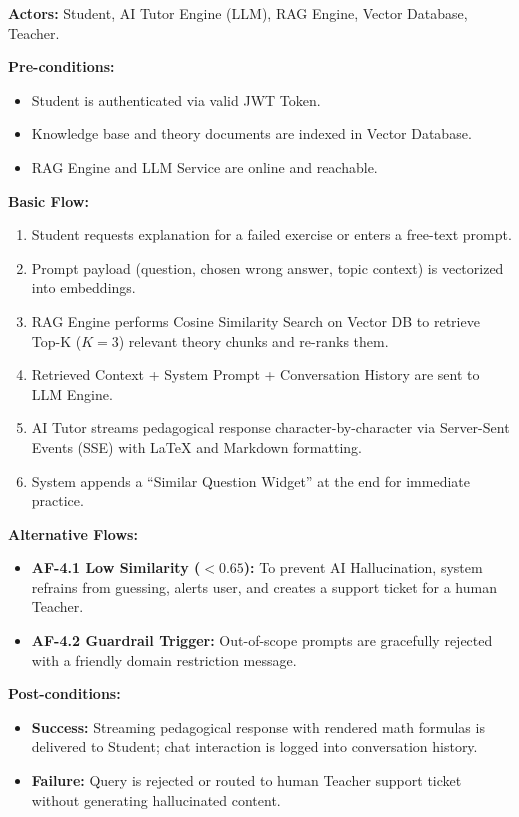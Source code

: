 \documentclass[12pt,a4paper]{article}
\begin{document}
\noindent\textbf{Actors:} Student, AI Tutor Engine (LLM), RAG Engine, Vector Database, Teacher.

\vspace{0.2cm}
\noindent\textbf{Pre-conditions:}
\begin{itemize}[leftmargin=1.5em, itemsep=0.1em]
    \item Student is authenticated via valid JWT Token.
    \item Knowledge base and theory documents are indexed in Vector Database.
    \item RAG Engine and LLM Service are online and reachable.
\end{itemize}

\noindent\textbf{Basic Flow:}
\begin{enumerate}[leftmargin=1.5em, itemsep=0.2em]
    \item Student requests explanation for a failed exercise or enters a free-text prompt.
    \item Prompt payload (question, chosen wrong answer, topic context) is vectorized into embeddings.
    \item RAG Engine performs Cosine Similarity Search on Vector DB to retrieve Top-K ($K=3$) relevant theory chunks and re-ranks them.
    \item Retrieved Context + System Prompt + Conversation History are sent to LLM Engine.
    \item AI Tutor streams pedagogical response character-by-character via Server-Sent Events (SSE) with LaTeX and Markdown formatting.
    \item System appends a ``Similar Question Widget'' at the end for immediate practice.
\end{enumerate}

\noindent\textbf{Alternative Flows:}
\begin{itemize}[leftmargin=1.5em, itemsep=0.2em]
    \item \textbf{AF-4.1 Low Similarity ($< 0.65$):} To prevent AI Hallucination, system refrains from guessing, alerts user, and creates a support ticket for a human Teacher.
    \item \textbf{AF-4.2 Guardrail Trigger:} Out-of-scope prompts are gracefully rejected with a friendly domain restriction message.
\end{itemize}

\noindent\textbf{Post-conditions:}
\begin{itemize}[leftmargin=1.5em, itemsep=0.2em]
    \item \textbf{Success:} Streaming pedagogical response with rendered math formulas is delivered to Student; chat interaction is logged into conversation history.
    \item \textbf{Failure:} Query is rejected or routed to human Teacher support ticket without generating hallucinated content.
\end{itemize}
\end{document}
